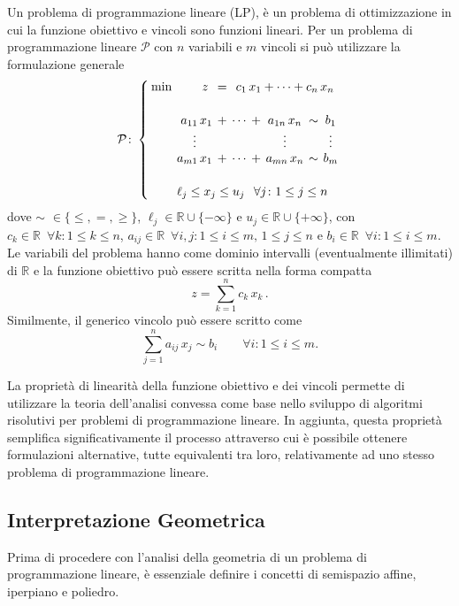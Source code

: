 Un problema di programmazione lineare (LP), è un problema di ottimizzazione
in cui la funzione obiettivo e vincoli sono funzioni lineari. Per un problema
di programmazione lineare $\mathcal{P}$ con $n$ variabili e $m$ vincoli si
può utilizzare la formulazione generale
\begin{equation}
\mathcal{P}\colon
\setlength{\arraycolsep}{2pt}
\left\{\begin{array}{rrcccccc}
\min & z\,\, &=& \multicolumn{5}{c}{c_{1}\,x_{1}+\cdots+c_{n}\,x_{n}} \\[15pt]
     &  a_{11}\,x_{1} &+ &\cdots &+ &a_{1n}\,x_{n} &\sim &b_{1}       \\
     & \multicolumn{1}{c}{\vdots} &&&&\vdots&& \vdots                 \\
     &  a_{m1}\,x_{1} &+ &\cdots &+ &a_{mn}\,x_{n} &\sim &b_{m}       \\[15pt]
     & \multicolumn{7}{l}{\ell_j \le x_{j} \le u_{j} \;\;\, \forall j\colon
     1 \le j \le n}
\end{array}\right.\\[10pt]
\end{equation}
dove $\sim\,\,\in \{ \le, =, \ge \}$, $\ell_j \in \mathbb{R} \cup
\{-\infty\}$ e $u_{j} \in \mathbb{R} \cup \{+\infty\}$, con $c_{k} \in
\mathbb{R} \,\,\, \forall k\colon 1 \le k \le n$, $a_{ij} \in \mathbb{R}
\,\,\, \forall i,j\colon 1 \le i \le m,\, 1 \le j \le n$ e $b_{i} \in
\mathbb{R} \,\,\, \forall i\colon 1 \le i \le m$. Le variabili del
problema hanno come dominio intervalli (eventualmente illimitati) di
$\mathbb{R}$ e la funzione obiettivo può essere scritta nella forma compatta
\begin{equation}
    z = \sum_{k=1}^{n} c_{k}\,x_{k}\,.
\end{equation}
Similmente, il generico vincolo può essere scritto come
\begin{equation}
    \sum_{j=1}^{n}a_{ij}\,x_{j} \sim b_{i} \qquad \forall i\colon 1 \le i \le m
.\end{equation}

La proprietà di linearità della funzione obiettivo e dei vincoli permette
di utilizzare la teoria dell'analisi convessa come base nello sviluppo di
algoritmi risolutivi per problemi di programmazione lineare. In aggiunta,
questa proprietà semplifica significativamente il processo attraverso cui è
possibile ottenere formulazioni alternative, tutte equivalenti tra loro,
relativamente ad uno stesso problema di programmazione lineare.

\subsection{Interpretazione Geometrica}
Prima di procedere con l'analisi della geometria di un problema di
programmazione lineare, è essenziale definire i concetti di semispazio
affine, iperpiano e poliedro.

